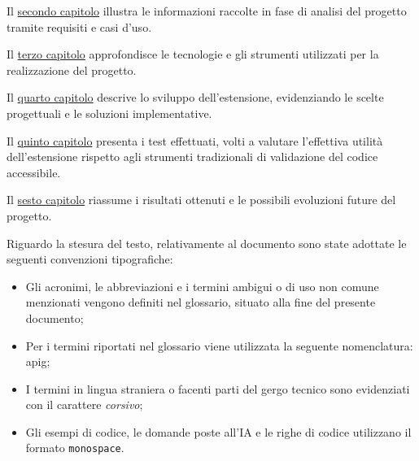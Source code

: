 \begin{description}
    \item Il {\hyperref[chap:analisi-requisiti]{secondo capitolo}} illustra le informazioni raccolte in fase di analisi del progetto tramite requisiti e casi d’uso.
    \item Il {\hyperref[chap:linguaggi-tecnologie]{terzo capitolo}} approfondisce le tecnologie e gli strumenti utilizzati per la realizzazione del progetto.
    \item Il {\hyperref[chap:sviluppo]{quarto capitolo}} descrive lo sviluppo dell’estensione, evidenziando le scelte progettuali e le soluzioni implementative.
    \item Il {\hyperref[chap:test]{ quinto capitolo}} presenta i test effettuati, volti a valutare l’effettiva utilità dell’estensione rispetto agli strumenti tradizionali di validazione del codice accessibile.
    \item Il {\hyperref[chap:conclusioni]{ sesto capitolo}} riassume i risultati ottenuti e le possibili evoluzioni future del progetto. 
\end{description}

\noindent Riguardo la stesura del testo, relativamente al documento sono state adottate le seguenti convenzioni tipografiche:
\begin{itemize}
	\item Gli acronimi, le abbreviazioni e i termini ambigui o di uso non comune menzionati vengono definiti nel glossario, situato alla fine del presente documento;
	\item Per i termini riportati nel glossario viene utilizzata la seguente nomenclatura: \gls{apig};
	\item I termini in lingua straniera o facenti parti del gergo tecnico sono evidenziati con il carattere \textit{corsivo};
	\item Gli esempi di codice, le domande poste all'IA e le righe di codice utilizzano il formato \texttt{monospace}.
\end{itemize}

\newpage

